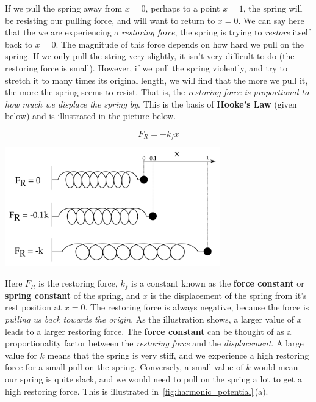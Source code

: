 \documentclass{memoir}[11pt,oneside,a4paper,openany]
\begin{document}
If we pull the spring away from $x=0$, perhaps to a point $x=1$, the spring will be resisting our pulling force, and will want to return to $x=0$. We can say here that the we are experiencing a \emph{restoring force}, the spring is trying to \emph{restore} itself back to $x=0$. The magnitude of this force depends on how hard we pull on the spring. If we only pull the string very slightly, it isn't very difficult to do (the restoring force is small). However, if we pull the spring violently, and try to stretch it to many times its original length, we will find that the more we pull it, the more the spring seems to resist. That is, the \emph{restoring force is proportional to how much we displace the spring by}. This is the basis of \textbf{Hooke's Law} (given below) and is illustrated in the picture below. 

\begin{minipage}{0.3\textwidth}
\begin{equation}
	F_R = -k_f x
\end{equation}
\end{minipage}
\hspace{2cm}
\begin{minipage}{0.6\textwidth}
	\centering
	\includegraphics[width=0.7\textwidth]{hooke_law.png}
\end{minipage}

Here $F_R$ is the restoring force, $k_f$ is a constant known as the \textbf{force constant} or \textbf{spring constant} of the spring, and $x$ is the displacement of the spring from it's rest position at $x=0$. The restoring force is always negative, because the force is \emph{pulling us back towards the origin}. As the illustration shows, a larger value of $x$ leads to a larger restoring force. The \textbf{force constant} can be thought of as a proportionality factor between the \emph{restoring force} and the \emph{displacement}. A large value for $k$ means that the spring is very stiff, and we experience a high restoring force for a small pull on the spring. Conversely, a small value of $k$ would mean our spring is quite slack, and we would need to pull on the spring a lot to get a high restoring force. This is illustrated in~\autoref{fig:harmonic_potential}\,(a). 
\end{document}
